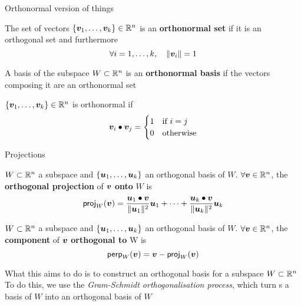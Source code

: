 \documentclass[aspectratio=169]{beamer}\usepackage[]{graphicx}\usepackage[]{xcolor}
\begin{document}
\begin{frame}{Orthonormal version of things}
\begin{definition}
The set of vectors $\{\bm{v}_1,\ldots,\bm{v}_k\}\in\mathbb{R}^n$ is an \textbf{orthonormal set} if it is an orthogonal set and furthermore
\[
\forall i=1,\ldots,k,\quad \|\bm{v}_i\|=1
\]
\end{definition}
\begin{definition}
A basis of the subspace $W\subset\mathbb{R}^n$ is an \textbf{orthonormal basis} if the vectors composing it are an orthonormal set
\end{definition}
\vfill
$\{\bm{v}_1,\ldots,\bm{v}_k\}\in\mathbb{R}^n$ is orthonormal if
\[
\bm{v}_i\bullet\bm{v}_j =
\begin{cases}
1 &\textrm{if }i=j \\
0 &\textrm{otherwise}
\end{cases}
\]
\end{frame}


\begin{frame}{Projections}
	\begin{definition}
	$W\subset\mathbb{R}^n$ a subspace and $\{\bm{u}_1,\ldots,\bm{u}_k\}$ an orthogonal basis of $W$. $\forall\bm{v}\in\mathbb{R}^n$, the \textbf{orthogonal projection} of $\bm{v}$ \textbf{onto} $W$ is
	\[
	\mathsf{proj}_W(\bm{v}) =
	\frac{\bm{u}_1\bullet\bm{v}}{\|\bm{u}_1\|^2}\bm{u}_1
	+\cdots+
	\frac{\bm{u}_k\bullet\bm{v}}{\|\bm{u}_k\|^2}\bm{u}_k
	\]  
	\end{definition}
	\vfill
	\begin{definition}
	$W\subset\mathbb{R}^n$ a subspace and $\{\bm{u}_1,\ldots,\bm{u}_k\}$ an orthogonal basis of $W$. $\forall\bm{v}\in\mathbb{R}^n$, the \textbf{component} of  $\bm{v}$ \textbf{orthogonal to} W is
	\[
	\mathsf{perp}_W(\bm{v})=\bm{v}-\mathsf{proj}_W(\bm{v})
	\]
	\end{definition}	
	\end{frame}
	
	
	\begin{frame}
	What this aims to do is to construct an orthogonal basis for a subspace $W\subset\mathbb{R}^n$
	\vfill
	To do this, we use the \emph{Gram-Schmidt orthogonalisation process}, which turn s a basis of $W$ into an orthogonal basis of $W$
	\end{frame}
	
\end{document}
